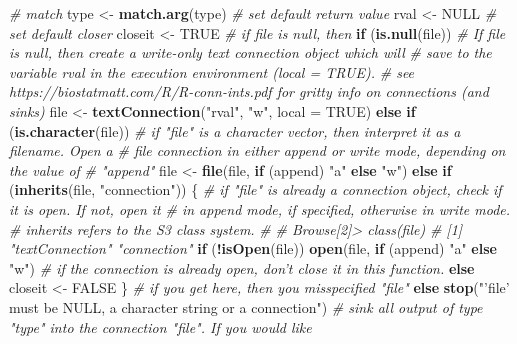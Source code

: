 \documentclass[]{book}
\newenvironment{Shaded}{\begin{snugshade}}{\end{snugshade}}
\newcommand{\CommentTok}[1]{\textcolor[rgb]{0.56,0.35,0.01}{\textit{#1}}}
\newcommand{\ControlFlowTok}[1]{\textcolor[rgb]{0.13,0.29,0.53}{\textbf{#1}}}
\newcommand{\DataTypeTok}[1]{\textcolor[rgb]{0.13,0.29,0.53}{#1}}
\newcommand{\KeywordTok}[1]{\textcolor[rgb]{0.13,0.29,0.53}{\textbf{#1}}}
\newcommand{\NormalTok}[1]{#1}
\newcommand{\OperatorTok}[1]{\textcolor[rgb]{0.81,0.36,0.00}{\textbf{#1}}}
\newcommand{\OtherTok}[1]{\textcolor[rgb]{0.56,0.35,0.01}{#1}}
\newcommand{\StringTok}[1]{\textcolor[rgb]{0.31,0.60,0.02}{#1}}
\begin{document}
\begin{Shaded}
\begin{Highlighting}[]
  \CommentTok{# match}
\NormalTok{  type <-}\StringTok{ }\KeywordTok{match.arg}\NormalTok{(type)}
  \CommentTok{# set default return value}
\NormalTok{  rval <-}\StringTok{ }\OtherTok{NULL}
  \CommentTok{# set default closer}
\NormalTok{  closeit <-}\StringTok{ }\OtherTok{TRUE}
  \CommentTok{# if file is null, then}
  \ControlFlowTok{if}\NormalTok{ (}\KeywordTok{is.null}\NormalTok{(file))}
    \CommentTok{# If file is null, then create a write-only text connection object which will}
    \CommentTok{# save to the variable rval in the execution environment (local = TRUE).}
    \CommentTok{# see https://biostatmatt.com/R/R-conn-ints.pdf for gritty info on connections (and sinks)}
\NormalTok{    file <-}\StringTok{ }\KeywordTok{textConnection}\NormalTok{(}\StringTok{"rval"}\NormalTok{, }\StringTok{"w"}\NormalTok{, }\DataTypeTok{local =} \OtherTok{TRUE}\NormalTok{)}
  \ControlFlowTok{else} \ControlFlowTok{if}\NormalTok{ (}\KeywordTok{is.character}\NormalTok{(file))}
    \CommentTok{# if "file" is a character vector, then interpret it as a filename.  Open a}
    \CommentTok{# file connection in either append or write mode, depending on the value of}
    \CommentTok{# "append"}
\NormalTok{    file <-}\StringTok{ }\KeywordTok{file}\NormalTok{(file, }\ControlFlowTok{if}\NormalTok{ (append)}
      \StringTok{"a"}
      \ControlFlowTok{else} \StringTok{"w"}\NormalTok{)}
  \ControlFlowTok{else} \ControlFlowTok{if}\NormalTok{ (}\KeywordTok{inherits}\NormalTok{(file, }\StringTok{"connection"}\NormalTok{)) \{}
    \CommentTok{# if "file" is already a connection object, check if it is open.  If not, open it}
    \CommentTok{# in append mode, if specified, otherwise in write mode.}
    \CommentTok{# inherits refers to the S3 class system.}
    \CommentTok{#}
    \CommentTok{# Browse[2]> class(file)}
    \CommentTok{# [1] "textConnection" "connection"}
    \ControlFlowTok{if}\NormalTok{ (}\OperatorTok{!}\KeywordTok{isOpen}\NormalTok{(file))}
      \KeywordTok{open}\NormalTok{(file, }\ControlFlowTok{if}\NormalTok{ (append)}
        \StringTok{"a"}
        \ControlFlowTok{else} \StringTok{"w"}\NormalTok{)}
    \CommentTok{# if the connection is already open, don't close it in this function.}
    \ControlFlowTok{else}\NormalTok{ closeit <-}\StringTok{ }\OtherTok{FALSE}
\NormalTok{  \}}
  \CommentTok{# if you get here, then you misspecified "file"}
  \ControlFlowTok{else} \KeywordTok{stop}\NormalTok{(}\StringTok{"'file' must be NULL, a character string or a connection"}\NormalTok{)}
  \CommentTok{# sink all output of type "type" into the connection "file".  If you would like}

\end{Highlighting}
\end{Shaded}
\end{document}
